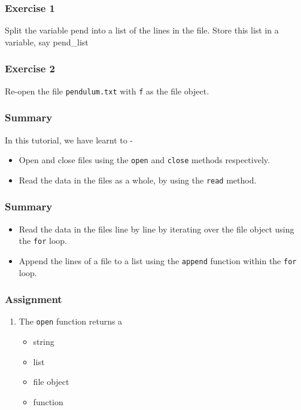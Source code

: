 \documentclass[17pt]{beamer}
\newcounter{saveenumi}
\newcommand{\seti}{\setcounter{saveenumi}{\value{enumi}}}
\begin{document}
\begin{frame}
\frametitle{Exercise 1}
\label{sec-4}

  Split the variable pend into a list of the lines in the file. Store this list in a variable, say pend\_list
\end{frame}
\begin{frame}
\frametitle{Exercise 2}
\label{sec-5}

  Re-open the file \texttt{pendulum.txt} with \texttt{f} as the file object.
\end{frame}
\begin{frame}
\frametitle{Summary}
\label{sec-6}

  In this tutorial, we have learnt to -\pause

\begin{itemize}
\item Open and close files using the \texttt{open} and \texttt{close} methods respectively.\pause
\item Read the data in the files as a whole, by using the \texttt{read} method.
\end{itemize}
\end{frame}
\begin{frame}
\frametitle{Summary}
\label{sec-6}
\begin{itemize}
\item Read the data in the files line by line by iterating over the file object using the \texttt{for} loop.\pause
\item Append the lines of a file to a list using the \texttt{append} function within the \texttt{for} loop.
\end{itemize}
\end{frame}
\begin{frame}
\frametitle{Assignment}
\label{sec-7.1}
\begin{enumerate}
\item The \texttt{open} function returns a
\begin{itemize}
\item string
\item list
\item file object
\item function
\end{itemize}
\seti
\end{enumerate}
\end{frame}
\end{document}
